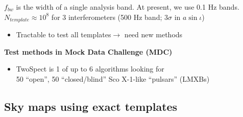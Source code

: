 $f_{bw}$ is the width of a single analysis band. At present, we use 0.1 Hz bands.
$N_{template}\approx10^{8}$ for 3 interferometers (500 Hz band; $3\sigma$
in $a\sin\iota$)$ $
\begin{itemize}
\item Tractable to test all templates$\rightarrow$ need new methods
\end{itemize}

\textbf{Test methods in Mock Data Challenge (MDC)}
\begin{itemize}
\item TwoSpect is 1 of up to 6 algorithms looking for \\
50 ``open'', 50 ``closed/blind'' Sco X-1-like ``pulsars'' (LMXBs)
\end{itemize}

\subsection{Sky maps using exact templates}


